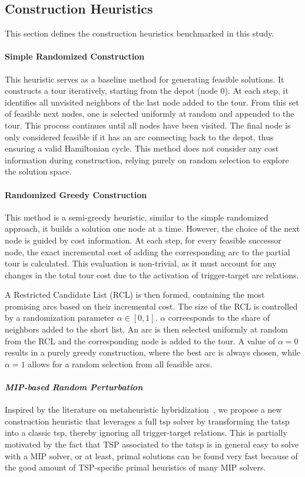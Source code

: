 \documentclass[twocolumn, switch]{article} %
\begin{document}
\subsection{Construction Heuristics}
This section defines the construction heuristics benchmarked in this study.

\paragraph{Simple Randomized Construction}
This heuristic serves as a baseline method for generating feasible solutions. It constructs a tour iteratively, starting from the depot (node 0). At each step, it identifies all unvisited neighbors of the last node added to the tour. From this set of feasible next nodes, one is selected uniformly at random and appended to the tour. This process continues until all nodes have been visited. The final node is only considered feasible if it has an arc connecting back to the depot, thus ensuring a valid Hamiltonian cycle. This method does not consider any cost information during construction, relying purely on random selection to explore the solution space.

\paragraph{Randomized Greedy Construction}
This method is a semi-greedy heuristic, similar to the simple randomized approach, it builds a solution one node at a time. However, the choice of the next node is guided by cost information. At each step, for every feasible successor node, the exact incremental cost of adding the corresponding arc to the partial tour is calculated. This evaluation is non-trivial, as it must account for any changes in the total tour cost due to the activation of trigger-target arc relations.

A Restricted Candidate List (RCL) is then formed, containing the most promising arcs based on their incremental cost. The size of the RCL is controlled by a randomization parameter $\alpha \in [0, 1]$. $\alpha$ correesponds to the share of neighbors added to the short list. An arc is then selected uniformly at random from the RCL and the corresponding node is added to the tour. A value of $\alpha = 0$ results in a purely greedy construction, where the best arc is always chosen, while $\alpha = 1$ allows for a random selection from all feasible arcs.
  
\paragraph{\textit{MIP-based Random Perturbation}}
Inspired by the literature on metaheuristic hybridization~\cite{Blum2016}, we propose a new construction heuristic that leverages a full \gls{tsp} solver by transforming the \gls{tatsp} into a classic \gls{tsp}, thereby ignoring all trigger-target relations.
This is partially motivated by the fact that TSP associated to the \gls{tatsp} is in general easy to solve with a MIP solver, or at least, primal solutions can be found very fast because of the good amount of TSP-specific primal heuristics of many MIP solvers.
\end{document}
